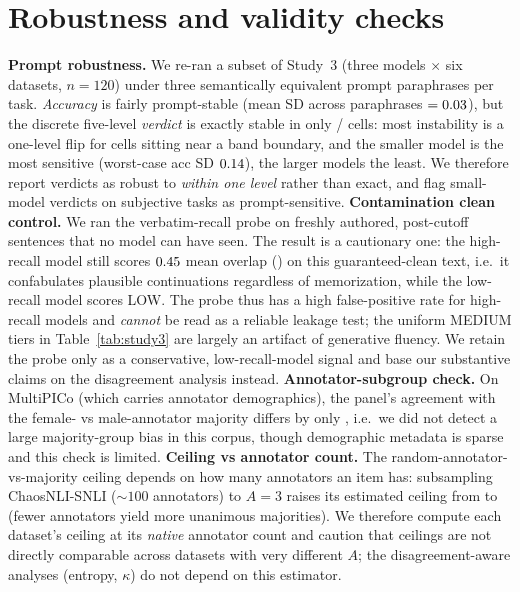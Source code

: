 \section{Robustness and validity checks}\label{app:robust}
\textbf{Prompt robustness.} We re-ran a subset of Study~3 (three models $\times$ six datasets, $n{=}120$) under
three semantically equivalent prompt paraphrases per task. \emph{Accuracy} is fairly prompt-stable (mean SD across
paraphrases $=0.03$), but the discrete five-level \emph{verdict} is exactly stable in only \PRstable{}/\PRtotal{}
cells: most instability is a one-level flip for cells sitting near a band boundary, and the smaller model is the most
sensitive (worst-case acc SD $0.14$), the larger models the least. We therefore report verdicts as robust to
\emph{within one level} rather than exact, and flag small-model verdicts on subjective tasks as prompt-sensitive.
\textbf{Contamination clean control.} We ran the verbatim-recall probe on freshly authored, post-cutoff sentences
that no model can have seen. The result is a cautionary one: the high-recall model still scores $0.45$ mean
overlap (\CCflag) on this guaranteed-clean text, i.e.\ it confabulates plausible continuations regardless of
memorization, while the low-recall model scores LOW. The probe thus has a high false-positive rate for high-recall
models and \emph{cannot} be read as a reliable leakage test; the uniform MEDIUM tiers in Table~\ref{tab:study3} are
largely an artifact of generative fluency. We retain the probe only as a conservative, low-recall-model signal and
base our substantive claims on the disagreement analysis instead.
\textbf{Annotator-subgroup check.} On MultiPICo (which carries annotator demographics), the panel's agreement with
the female- vs male-annotator majority differs by only \MPCgenderGap, i.e.\ we did not detect a large majority-group
bias in this corpus, though demographic metadata is sparse and this check is limited.
\textbf{Ceiling vs annotator count.} The random-annotator-vs-majority ceiling depends on how many annotators an item
has: subsampling ChaosNLI-SNLI (${\sim}100$ annotators) to $A{=}3$ raises its estimated ceiling from
\RTwoablCeilFull{} to \RTwoablCeilThree{} (fewer annotators yield more unanimous majorities). We therefore compute
each dataset's ceiling at its \emph{native} annotator count and caution that ceilings are not directly comparable
across datasets with very different $A$; the disagreement-aware analyses (entropy, $\kappa$) do not depend on this
estimator.

